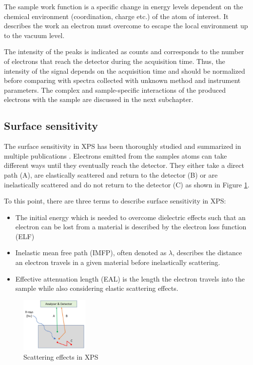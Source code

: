 The sample work function is a specific change in energy levels dependent on the chemical environment (coordination, charge etc.) of the atom of interest. It describes the work an electron must overcome to escape the local environment up to the vacuum level. 


The intensity of the peaks is indicated as counts and corresponds to the number of electrons that reach the detector during the acquisition time. Thus, the intensity of the signal depends on the acquisition time and should be normalized before comparing with spectra collected with unknown method and instrument parameters.
The complex and sample-specific interactions of the produced electrons with the sample are discussed in the next subchapter.

\subsection{Surface sensitivity}

The surface sensitivity in XPS has been thoroughly studied and summarized in multiple publications \cite{powell_surface_2009, powell_surface_1999}. Electrons emitted from the samples atoms can take different ways until they eventually reach the detector. They either take a direct path (A), are elastically scattered and return to the detector (B) or are inelastically scattered and do not return to the detector (C) as shown in Figure \ref{fig:scattering}.

To this point, there are three terms to describe surface sensitivity in XPS:
\begin{itemize}
\item The initial energy which is needed to overcome dielectric effects such that an electron can be lost from a material is described by the electron loss function (ELF)
\item Inelastic mean free path (IMFP), often denoted as $\lambda$, describes the distance an electron travels in a given material before inelastically scattering.
\item Effective attenuation length (EAL) is the length the electron travels into the sample while also considering elastic scattering effects.
\end{itemize}

\begin{figure}[H]
    \centering
    \includegraphics[width=0.3\textwidth]{Figures/image6_1.jpg}
    \caption{Scattering effects in XPS \cite{stevie_introduction_2020}}
    \label{fig:scattering}
\end{figure}

